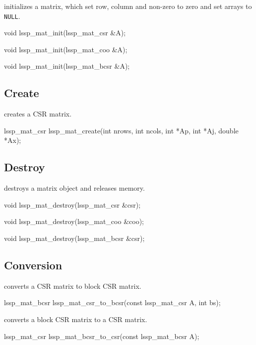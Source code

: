  initializes a matrix, which set row, column and non-zero to zero and 
set arrays to \verb|NULL|.

\begin{evb}
void lssp_mat_init(lssp_mat_csr &A);
\end{evb}

\begin{evb}
void lssp_mat_init(lssp_mat_coo &A);
\end{evb}

\begin{evb}
void lssp_mat_init(lssp_mat_bcsr &A);
\end{evb}

\subsection{Create}
 creates a CSR matrix.
\begin{evb}
lssp_mat_csr lssp_mat_create(int nrows, int ncols, int *Ap, int *Aj, double *Ax);
\end{evb}

\subsection{Destroy}

 destroys a matrix object and releases memory.
\begin{evb}
void lssp_mat_destroy(lssp_mat_csr &csr);
\end{evb}

\begin{evb}
void lssp_mat_destroy(lssp_mat_coo &coo);
\end{evb}

\begin{evb}
void lssp_mat_destroy(lssp_mat_bcsr &csr);
\end{evb}

\subsection{Conversion}
 converts a CSR matrix to block CSR matrix.
\begin{evb}
lssp_mat_bcsr lssp_mat_csr_to_bcsr(const lssp_mat_csr A, int bs);
\end{evb}

 converts a block CSR matrix to a CSR matrix.
\begin{evb}
lssp_mat_csr lssp_mat_bcsr_to_csr(const lssp_mat_bcsr A);  
\end{evb}


